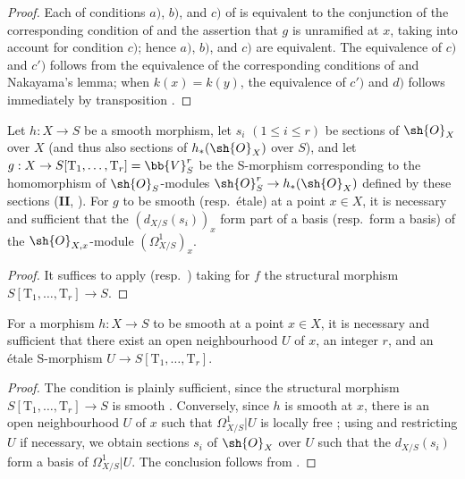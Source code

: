 \begin{proof}
Each of conditions $a)$, $b)$, and $c)$ of  is equivalent to the conjunction of the corresponding condition of  and the assertion that $g$ is unramified at $x$, taking  into account for condition $c)$; hence $a)$, $b)$, and $c)$ are equivalent.
The equivalence of $c)$ and $c')$ follows from the equivalence of the corresponding conditions of  and Nakayama's lemma; when $k(x)=k(y)$, the equivalence of $c')$ and $d)$ follows immediately by transposition .
\end{proof}

\begin{corollary}[17.11.3]
\label{IV.17.11.3}
Let $h:X\to S$ be a smooth morphism, let $s_i$ $(1\leq i\leq r)$ be sections of $\sh{O}_X$ over $X$ (and thus also sections of $h_*(\sh{O}_X)$ over $S$), and let
$g:X\to S[\mathrm{T}_1,\ldots,\mathrm{T}_r]=\bb{V}^r_S$
be the S-morphism corresponding to the homomorphism of $\sh{O}_S$-modules
$\sh{O}^r_S\to h_*(\sh{O}_X)$ defined by these sections (\textbf{II}, ).
For $g$ to be smooth (resp.\ \'etale) at a point $x\in X$, it is necessary and sufficient that the $(d_{X/S}(s_i))_x$ form part of a basis (resp.\ form a basis) of the $\sh{O}_{X,x}$-module $(\Omega^1_{X/S})_x$.
\end{corollary}

\begin{proof}
It suffices to apply  (resp.\ ) taking for $f$ the structural morphism $S[\mathrm{T}_1,\ldots,\mathrm{T}_r]\to S$.
\end{proof}

\begin{corollary}[17.11.4]
\label{IV.17.11.4}
For a morphism $h:X\to S$ to be smooth at a point $x\in X$, it is necessary and sufficient that there exist an open neighbourhood $U$ of $x$, an integer $r$, and an \'etale S-morphism
$U\to S[\mathrm{T}_1,\ldots,\mathrm{T}_r]$.
\end{corollary}


\begin{proof}
The condition is plainly sufficient, since the structural morphism $S[\mathrm{T}_1,\ldots,\mathrm{T}_r]\to S$ is smooth .
Conversely, since $h$ is smooth at $x$, there is an open neighbourhood $U$ of $x$ such that $\Omega^1_{X/S}|U$ is locally free ; using  and restricting $U$ if necessary, we obtain sections $s_i$ of $\sh{O}_X$ over $U$ such that the $d_{X/S}(s_i)$ form a basis of $\Omega^1_{X/S}|U$.
The conclusion follows from .
\end{proof}

